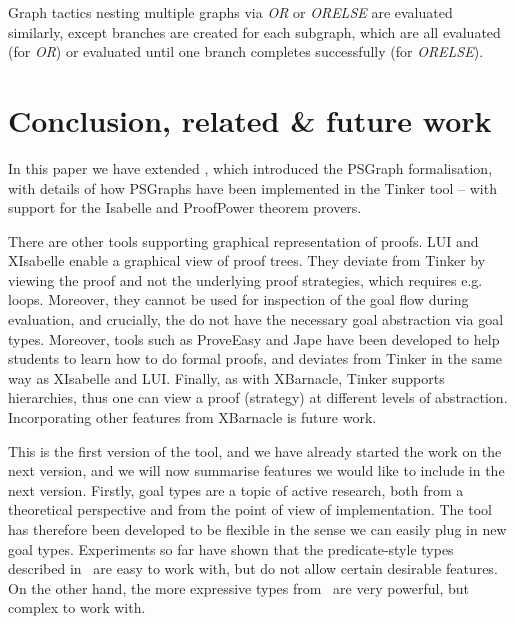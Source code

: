 \documentclass[submission,copyright,creativecommons]{eptcs}
\begin{document}
Graph tactics nesting multiple graphs via \textit{OR} or \textit{ORELSE} are evaluated similarly, except branches are created for each subgraph, which are all evaluated (for \textit{OR}) or evaluated until one branch completes successfully (for \textit{ORELSE}).



\vspace{-15pt}
\section{Conclusion, related \& future work}
\vspace{-10pt}

In this paper we have extended \cite{LPAR13}, which introduced the PSGraph formalisation, with details of how PSGraphs have been implemented in the Tinker tool -- with support for the Isabelle and ProofPower theorem provers. 

There are other tools supporting graphical representation of proofs. LUI \cite{SiekmannHBCFHKKMMPS99} and XIsabelle \cite{Ozols97} enable a graphical view of proof trees. They deviate from Tinker by viewing the proof and not the underlying proof strategies, which requires e.g. loops. Moreover, they cannot be used for inspection of the goal flow during evaluation, and crucially, the do not have the necessary goal abstraction via goal types. Moreover, tools such as ProveEasy \cite{Burstall2000} and
Jape \cite{bornat1997jape} have been developed to help students to learn how to do formal proofs, and deviates from Tinker in the same way as XIsabelle and LUI. Finally, as with XBarnacle\cite{Lowe97xbarnacle},  Tinker supports hierarchies, thus one can view a proof (strategy) at different levels of abstraction. Incorporating other features from XBarnacle is future work.

This is the first version of the tool, and we have already started the work on the next version, and we will now summarise features we would like to include in the next version. Firstly, goal types are a topic of active research, both from a theoretical perspective and from the point of view of implementation. The tool has therefore been developed to be flexible in the sense we can easily plug in new goal types. Experiments so far have shown that the predicate-style types described in~\cite{LPAR13} are easy to work with, but do not allow certain desirable features. On the other hand, the more expressive types from~\cite{grov13a} are very powerful, but complex to work with.
\end{document}
